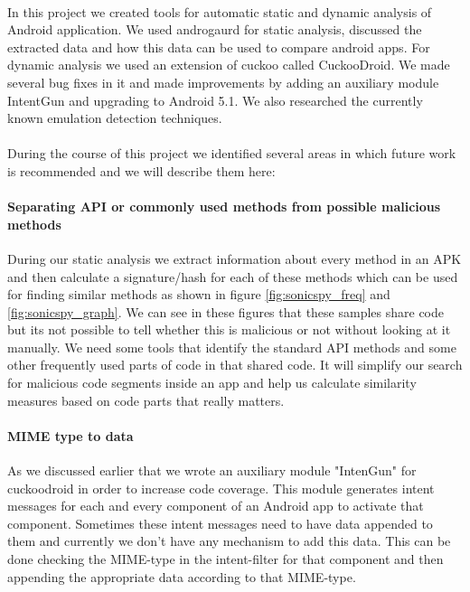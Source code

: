 \documentclass[../main.tex]{subfile}
\begin{document}
\paragraph{} In this project we created tools for automatic static and dynamic analysis of Android application. We used androgaurd for static analysis, discussed the extracted data and how this data can be used to compare android apps. For dynamic analysis we used an extension of cuckoo called CuckooDroid. We made several bug fixes in it and made improvements by adding  an auxiliary module IntentGun and upgrading to Android 5.1. We also researched the currently known emulation detection techniques.

\paragraph{} During the course of this project we identified several areas in which future work is recommended and we will describe them here:
\paragraph{Separating API or commonly used methods from possible malicious methods} During our static analysis we extract information about every method in an APK and then calculate a signature/hash for each of these methods which can be used for finding similar methods as shown in figure \ref{fig:sonicspy_freq} and \ref{fig:sonicspy_graph}. We can see in these figures that these samples share code but its not possible to tell whether this is malicious or not without looking at it manually. We need some tools that identify the standard API methods and some other frequently used parts of code in that shared code. It will simplify our search for malicious code segments inside an app and help us calculate similarity measures based on code parts that really matters.
\paragraph{MIME type to data} As we discussed earlier that we wrote an auxiliary module "IntenGun" for cuckoodroid in order to increase code coverage. This module generates intent messages for each and every component of an Android app to activate that component. Sometimes these intent messages need to have data appended to them and currently we don't have any mechanism to add this data. This can be done checking the MIME-type in the intent-filter for that component and then appending the appropriate data according to that MIME-type.
\end{document}
